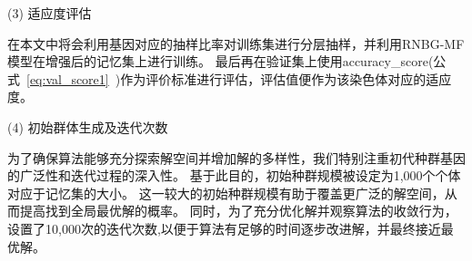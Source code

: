 (3) 适应度评估\par
在本文中将会利用基因对应的抽样比率对训练集进行分层抽样，并利用RNBG-MF模型在增强后的记忆集上进行训练。
最后再在验证集上使用accuracy\_score(公式~\ref{eq:val_score1}~)作为评价标准进行评估，评估值便作为该染色体对应的适应度。\par

(4) 初始群体生成及迭代次数\par
为了确保算法能够充分探索解空间并增加解的多样性，我们特别注重初代种群基因的广泛性和迭代过程的深入性。
基于此目的，初始种群规模被设定为1,000个个体对应于记忆集的大小。
这一较大的初始种群规模有助于覆盖更广泛的解空间，从而提高找到全局最优解的概率。
同时，为了充分优化解并观察算法的收敛行为，设置了10,000次的迭代次数,以便于算法有足够的时间逐步改进解，并最终接近最优解。\par


